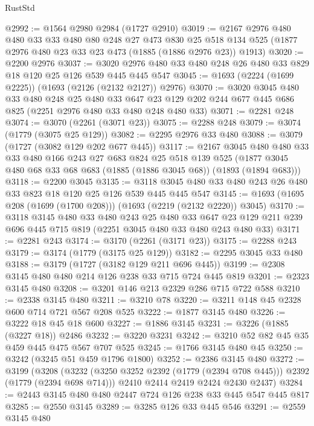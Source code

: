 \begin{lexlean}{RustStd}
\begin{coremodule}
@2992 := @1564 @2980 @2984 (@1727 @2910)
@3019 := @2167
    @2976
    @480
    @480
    @33
    @33
    @480
    @80
    @248
    @27
    @473
    @830
    @25
    @518
    @134
    @525
    (@1877 @2976 @480 @23 @33 @23 @473 (@1885 (@1886 @2976 @23)) @1913)
@3020 := @2200 @2976
@3037 := @3020 @2976 @480 @33 @480 @248 @26 @480 @33 @829 @18 @120 @25 @126 @539 @445 @445 @547
@3045 := @1693 (@2224 (@1699 @2225)) (@1693 (@2126 (@2132 @2127)) @2976)
@3070 := @3020
    @3045
    @480
    @33
    @480
    @248
    @25
    @480
    @33
    @647
    @23
    @129
    @202
    @244
    @677
    @445
    @686
    @825
    (@2251 @2976 @480 @33 @480 @248 @480 @33)
@3071 := @2281 @248
@3074 := @3070 (@2261 (@3071 @23))
@3075 := @2288 @248
@3079 := @3074 (@1779 (@3075 @25 @129))
@3082 := @2295 @2976 @33 @480
@3088 := @3079 (@1727 (@3082 @129 @202 @677 @445))
@3117 := @2167
    @3045
    @480
    @480
    @33
    @33
    @480
    @166
    @243
    @27
    @683
    @824
    @25
    @518
    @139
    @525
    (@1877 @3045 @480 @68 @33 @68 @683 (@1885 (@1886 @3045 @68)) (@1893 (@1894 @683)))
@3118 := @2200 @3045
@3135 := @3118 @3045 @480 @33 @480 @243 @26 @480 @33 @823 @18 @120 @25 @126 @539 @445 @445 @547
@3145 := @1693 (@1695 @208 (@1699 (@1700 @208))) (@1693 (@2219 (@2132 @2220)) @3045)
@3170 := @3118
    @3145
    @480
    @33
    @480
    @243
    @25
    @480
    @33
    @647
    @23
    @129
    @211
    @239
    @696
    @445
    @715
    @819
    (@2251 @3045 @480 @33 @480 @243 @480 @33)
@3171 := @2281 @243
@3174 := @3170 (@2261 (@3171 @23))
@3175 := @2288 @243
@3179 := @3174 (@1779 (@3175 @25 @129))
@3182 := @2295 @3045 @33 @480
@3188 := @3179 (@1727 (@3182 @129 @211 @696 @445))
@3199 := @2308 @3145 @480 @480 @214 @126 @238 @33 @715 @724 @445 @819
@3201 := @2323 @3145 @480
@3208 := @3201 @146 @213 @2329 @286 @715 @722 @588
@3210 := @2338 @3145 @480
@3211 := @3210 @78
@3220 := @3211 @148 @45 @2328 @600 @714 @721 @567 @208 @525
@3222 := @1877 @3145 @480
@3226 := @3222 @18 @45 @18 @600
@3227 := @1886 @3145
@3231 := @3226 (@1885 (@3227 @18)) @2486
@3232 := @3220 @3231
@3242 := @3210 @52 @82 @45 @35 @459 @445 @475 @567 @707 @525
@3245 := @1766 @3145 @480 @45
@3250 := @3242 (@3245 @51 @459 @1796 @1800)
@3252 := @2386 @3145 @480
@3272 := @3199
    (@3208
      (@3232 (@3250 @3252 @2392 (@1779 (@2394 @708 @445))) @2392 (@1779 (@2394 @698 @714)))
      @2410
      @2414
      @2419
      @2424
      @2430
      @2437)
@3284 := @2443 @3145 @480 @480 @2447 @724 @126 @238 @33 @445 @547 @445 @817
@3285 := @2550 @3145
@3289 := @3285 @126 @33 @445 @546
@3291 := @2559 @3145 @480

\end{coremodule}
\end{lexlean}
